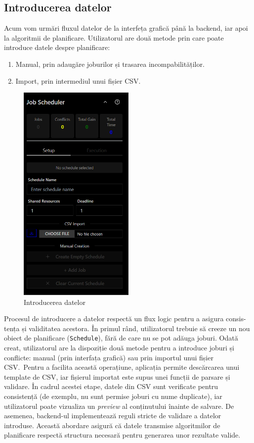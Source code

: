 \subsection{Introducerea datelor}
Acum vom urmări fluxul datelor de la interfeța grafică până la backend, iar apoi la algoritmii de planificare.
Utilizatorul are două metode prin care poate introduce datele despre planificare:
\begin{enumerate}
  \item Manual, prin adaugăre joburilor și trasarea incompabilităților.
  \item Import, prin intermediul unui fișier CSV.\
\end{enumerate}

\begin{figure}[h]
    \centering
    \includegraphics[width=0.5\textwidth]{images/ControlPanel.png}
    \caption{Introducerea datelor}\label{fig:ControlPanel}
\end{figure}

Procesul de introducere a datelor respectă un flux logic pentru a asigura consis- tența și validitatea acestora. În primul rând, utilizatorul trebuie să creeze un nou obiect de planificare (\texttt{Schedule}), fără de care nu se pot adăuga joburi. Odată creat, utilizatorul are la dispoziție două metode pentru a introduce joburi și conflicte: manual (prin interfața grafică) sau prin importul unui fișier CSV.\ Pentru a facilita această operațiune, aplicația permite descărcarea unui template de CSV, iar fișierul importat este supus unei funcții de parsare și validare. În cadrul acestei etape, datele din CSV sunt verificate pentru consistență (de exemplu, nu sunt permise joburi cu nume duplicate), iar utilizatorul poate vizualiza un \textit{preview} al conținutului înainte de salvare. De asemenea, backend-ul implementează reguli stricte de validare a datelor introduse. Această abordare asigură că datele transmise algoritmilor de planificare respectă structura necesară pentru generarea unor rezultate valide.

